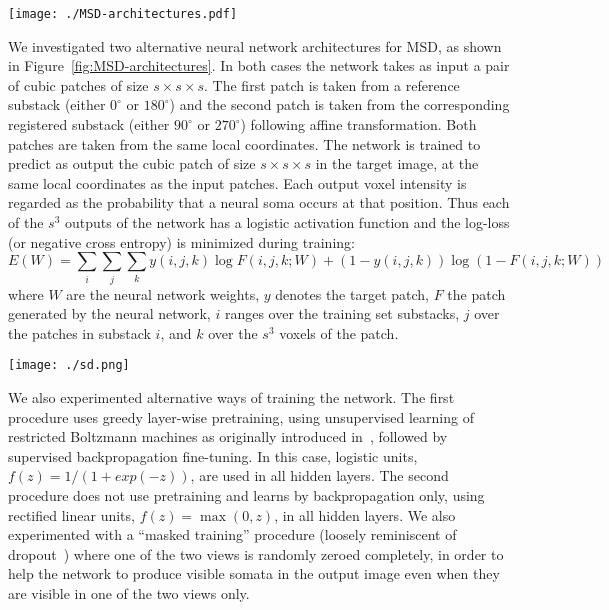 \documentclass[smallextended]{svjour3}       %
\begin{document}
\begin{figure*}
  \centering
  \texttt{[image: ./MSD-architectures.pdf]}
  \caption{Neural network architectures for multiview semantic deconvolution: flat (left) and columnar (right).}
  \label{fig:MSD-architectures}
\end{figure*}

We investigated two alternative neural network architectures for MSD,
as shown in Figure~\ref{fig:MSD-architectures}. In both cases the
network takes as input a pair of cubic patches of size
$s\times s\times s$. The first patch is taken from a reference substack (either $0^\circ$ or $180^\circ$) and the second patch is
taken from the corresponding registered substack (either $90^\circ$ or
$270^\circ$) following affine transformation. Both patches are taken
from the same local coordinates.  The network is trained to
predict as output the cubic patch of size $s\times s\times s$ in the
target image, at the same local coordinates as the input patches. Each
output voxel intensity is regarded as the probability that a neural
soma occurs at that position. Thus each of the $s^3$ outputs of the
network has a logistic activation function and the log-loss (or
negative cross entropy) is minimized during training:
\begin{equation}
  \label{eq:loss}
  E(W) = \sum_{i} \sum_{j} \sum_{k} y(i,j,k) \log F(i,j,k;W) + (1-y(i,j,k)) \log (1-F(i,j,k;W))
\end{equation}
where $W$ are the neural network weights, $y$ denotes the target patch, $F$ the patch generated by the neural network,
$i$ ranges over the
training set substacks, $j$ over the patches in
substack $i$, and $k$ over the $s^3$ voxels of the patch.

\begin{figure*}
  \centering
  \texttt{[image: ./sd.png]}
  \caption{Illustration of multiview semantic deconvolution. Left:
    $0^\circ$ view; middle: $90^\circ$ view; right: output image
    produced by semantic deconvolution. Best viewed by zooming in on the electronic version.}
  \label{fig:sd}
\end{figure*}

We also experimented alternative ways of training the network. The
first procedure uses greedy layer-wise pretraining, using unsupervised
learning of restricted Boltzmann machines as originally introduced
in~\cite{hinton_fast_2006}, followed by supervised backpropagation
fine-tuning. In this case, logistic units, $f(z)=1/(1+exp(-z))$, are
used in all hidden layers.  The second procedure does not use
pretraining and learns by backpropagation only, using rectified linear
units, $f(z) = \max(0,z)$, in all hidden layers. We also experimented with a ``masked training'' procedure
(loosely reminiscent of dropout~\cite{baldi_dropout_2014}) where one of the two views is randomly
zeroed completely, in order to help the network to produce visible
somata in the output image even when they are visible in one of the
two views only.
\end{document}

